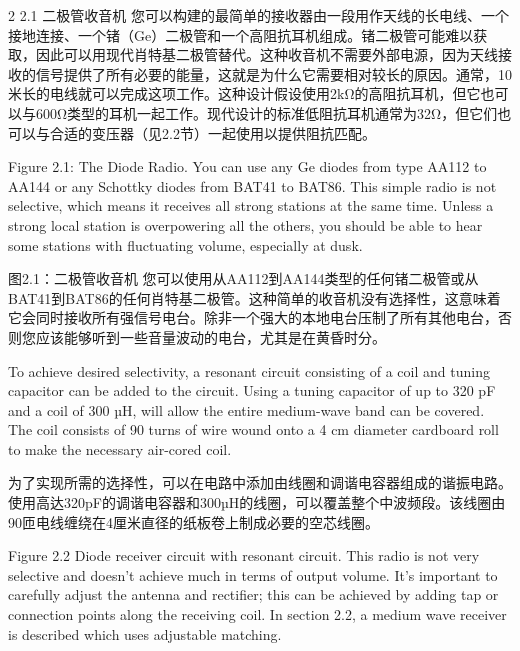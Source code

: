 \documentclass{ctexbook}
\begin{document}
\begin{paracol}{2}
2.1 二极管收音机
您可以构建的最简单的接收器由一段用作天线的长电线、一个接地连接、一个锗（Ge）二极管和一个高阻抗耳机组成。锗二极管可能难以获取，因此可以用现代肖特基二极管替代。这种收音机不需要外部电源，因为天线接收的信号提供了所有必要的能量，这就是为什么它需要相对较长的原因。通常，10米长的电线就可以完成这项工作。这种设计假设使用2kΩ的高阻抗耳机，但它也可以与600Ω类型的耳机一起工作。现代设计的标准低阻抗耳机通常为32Ω，但它们也可以与合适的变压器（见2.2节）一起使用以提供阻抗匹配。

\switchcolumn*

Figure 2.1: The Diode Radio. 
You can use any Ge diodes from type AA112 to AA144 or any Schottky diodes from BAT41 
to BAT86. This simple radio is not selective, which means it receives all strong stations at 
the same time. Unless a strong local station is overpowering all the others, you should be 
able to hear some stations with fluctuating volume, especially at dusk. 

\switchcolumn

图2.1：二极管收音机
您可以使用从AA112到AA144类型的任何锗二极管或从BAT41到BAT86的任何肖特基二极管。这种简单的收音机没有选择性，这意味着它会同时接收所有强信号电台。除非一个强大的本地电台压制了所有其他电台，否则您应该能够听到一些音量波动的电台，尤其是在黄昏时分。

\switchcolumn*

To achieve desired selectivity, a resonant circuit consisting of a coil and tuning capacitor can 
be added to the circuit. Using a tuning capacitor of up to 320 pF and a coil of 300 µH, will 
allow the entire medium-wave band can be covered. The coil consists of 90 turns of wire 
wound onto a 4 cm diameter cardboard roll to make the necessary air-cored coil. 

\switchcolumn

为了实现所需的选择性，可以在电路中添加由线圈和调谐电容器组成的谐振电路。使用高达320pF的调谐电容器和300µH的线圈，可以覆盖整个中波频段。该线圈由90匝电线缠绕在4厘米直径的纸板卷上制成必要的空芯线圈。

\switchcolumn*

Figure 2.2 Diode receiver circuit with resonant circuit. 
This radio is not very selective and doesn't achieve much in terms of output volume. It's 
important to carefully adjust the antenna and rectifier; this can be achieved by adding tap 
or connection points along the receiving coil. In section 2.2, a medium wave receiver is 
described which uses adjustable matching. 

\switchcolumn


\end{paracol}
\end{document}
